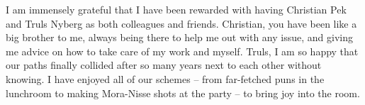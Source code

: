 


\noindent 
I am immensely grateful that I have been rewarded with having Christian Pek and Truls Nyberg as both colleagues and friends.  
Christian, you have been like a big brother to me, always being there to help me out with any issue, and giving me advice on how to take care of my work and myself. 
Truls, I am so happy that our paths finally collided after so many years next to each other without knowing. I have enjoyed all of our schemes -- from far-fetched puns in the lunchroom to making Mora-Nisse shots at the party -- to bring joy into the room. 
\newline 


